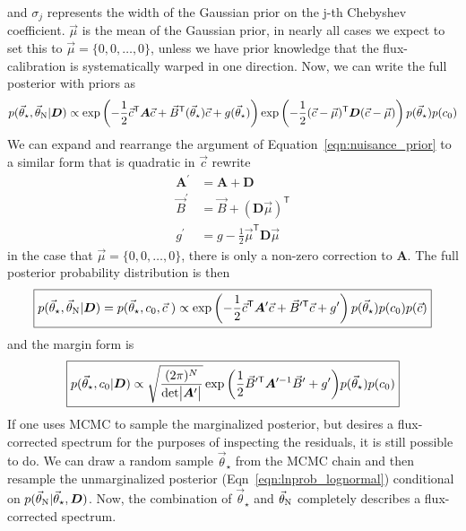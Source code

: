 \documentclass[preprint]{aastex} %
\newcommand{\vt}{\vec{\theta}}
\newcommand{\vstar}{\vt_{\star}}
\newcommand{\vN}{\vt_{\rm N}}
\newcommand{\vc}{\vec{c}}
\newcommand{\fD}{ {\bm D}}
\newcommand{\trans}{\mathsf{T}}
\begin{document}
and $\sigma_j$ represents the width of the Gaussian prior on the j-th Chebyshev coefficient. $\vec{\mu}$ is the mean of the Gaussian prior, in nearly all cases we expect to set this to $\vec{\mu} = \{0, 0, \ldots, 0\}$, unless we have prior knowledge that the flux-calibration is systematically warped in one direction. Now, we can write the full posterior with priors as
\begin{equation}
  p(\vstar, \vN | \fD) \propto \exp \left ( - \frac{1}{2} \vc^\trans {\bm A} \vc + \vec{B}^\trans(\vstar) \vc + g(\vstar) \right )  \exp \left ( -\frac{1}{2} (\vc - \vec{\mu})^\trans {\bm D} (\vc - \vec{\mu}) \right ) p(\vstar) p(c_0)
  \label{eqn:posterior_prior}
\end{equation}
We can expand and rearrange the argument of Equation~\ref{eqn:nuisance_prior} to a similar form that is quadratic in $\vc$ rewrite
\begin{align}
  {\bm A}^\prime &= {\bm A} + {\bm D}\\
  \vec{B}^\prime &= \vec{B} + ({\bm D} \vec{\mu})^\trans\\
  g^\prime &= g - \frac{1}{2} \vec{\mu}^\trans {\bm D} \vec{\mu} 
\end{align}
in the case that $\vec{\mu} = \{0, 0, \ldots, 0\}$, there is only a non-zero correction to ${\bm A}$. The full posterior probability distribution is then
 \begin{equation}
   \boxed{
  p(\vstar, \vN | \fD) = p(\vstar, c_0, \vc\;) \propto \exp \left ( - \frac{1}{2} \vc^\trans {\bm A}^\prime \vc + \vec{B}^{\prime \trans} \vc + g^\prime \right ) p(\vstar) p(c_0) p(\vc)
}
\label{eqn:lnprob_lognormal}
\end{equation}
and the margin form is 
\begin{equation}
  \boxed{
  p(\vstar, c_0 | \fD) \propto \sqrt{\frac{(2 \pi )^N}{ {\rm det} \bigl |{\bm A}^\prime \bigr |}} \exp{ \left ( \frac{1}{2} \vec{B}^{\prime\trans} {\bm A}^{\prime -1} \vec{B}^\prime + g^\prime \right )} p(\vstar) p(c_0)
}
\label{eqn:lnprob_lognormal_marg}
\end{equation}
If one uses MCMC to sample the marginalized posterior, but desires a flux-corrected spectrum for the purposes of inspecting the residuals, it is still possible to do. We can draw a random sample $\vstar$ from the MCMC chain and then resample the unmarginalized posterior (Eqn~\ref{eqn:lnprob_lognormal}) conditional on $p(\vN | \vstar, \fD)$. Now, the combination of $\vstar$ and $\vN$ completely describes a flux-corrected spectrum.
\end{document}
